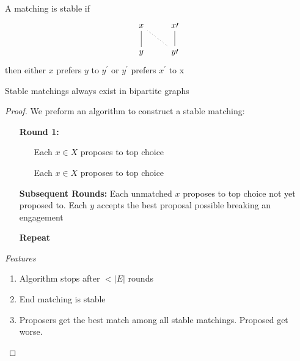 
\begin{definition}
    \label{def:stable matching}
    A matching is stable if 
\[\begin{tikzcd}
	x & x\prime \\
	y & y\prime
	\arrow[no head, from=1-1, to=2-1]
	\arrow[no head, from=1-2, to=2-2]
	\arrow[dotted, no head, from=1-1, to=2-2]
\end{tikzcd}\]
    then either \(x\) prefers \(y\) to \(y^\prime\) or \(y^\prime\) prefers \(x^\prime\) to x
\end{definition}  

\begin{theorem}
    \label{thm:gale-shapely}
    Stable matchings always exist in bipartite graphs
\end{theorem} 
\begin{proof}
    We preform an algorithm to construct a stable matching:
	\begin{enumerate}[align=left]
		\item[\textbf{Round 1:}] 
		\begin{enumerate}[align=left]
			\item[] 
			\item[] Each \(x \in X\) proposes to top choice
			\item[] Each \(x \in X\) proposes to top choice
		\end{enumerate}
		\item[\textbf{Subsequent Rounds:}] Each unmatched \(x\) proposes to top choice not yet proposed to. Each \(y\) accepts the best proposal possible breaking an engagement
		\item[\textbf{Repeat}]
	\end{enumerate}
		
    \emph{Features}
    \begin{enumerate}[align=left]
        \item Algorithm stops after \(<|E|\) rounds
        \item End matching is stable
        \item Proposers get the best match among all stable matchings. Proposed get worse.
    \end{enumerate}
\end{proof}
